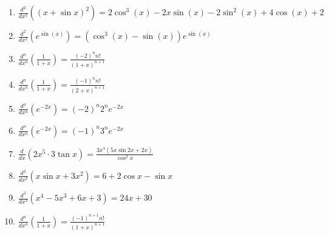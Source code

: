 \documentclass[11pt,a4paper]{article}
\begin{document}
\begin{enumerate}
\item $\displaystyle \frac{d^{2}}{dx^{2}}\left( (x + \sin x)^{2} \right) = 2\cos^{3}(x) - 2x\sin(x) - 2\sin^{2}(x) + 4\cos(x) + 2$
\item $\displaystyle \frac{d^{2}}{dx^{2}}\left( e^{\sin(x)} \right) = \left(\cos^{3}(x) - \sin(x)\right)e^{\sin(x)}$
\item $\displaystyle \frac{d^{n}}{dx^{n}}\left( \frac{1}{1 + x} \right) = \frac{(-2)^{n} n!}{(1 + x)^{n + 1}}$
\item $\displaystyle \frac{d^{n}}{dx^{n}}\left( \frac{1}{1 + x} \right) = \frac{(-1)^{n} n!}{(2 + x)^{n + 1}}$
\item $\displaystyle \frac{d^{n}}{dx^{n}}\left( e^{-2x} \right) = (-2)^{n} 2^{n} e^{-2x}$
\item $\displaystyle \frac{d^{n}}{dx^{n}}\left( e^{-2x} \right) = (-1)^{n} 3^{n} e^{-2x}$
\item $\displaystyle \frac{d}{dx}\left( 2x^{5} \cdot 3\tan x \right) = \frac{3x^{4}(5x\sin 2x + 2x)}{\cos^{2} x}$
\item $\displaystyle \frac{d^{2}}{dx^{2}}\left( x\sin x + 3x^{2} \right) = 6 + 2\cos x - \sin x$
\item $\displaystyle \frac{d^{3}}{dx^{3}}\left( x^{4} - 5x^{3} + 6x + 3 \right) = 24x + 30$
\item $\displaystyle \frac{d^{n}}{dx^{n}}\left( \frac{1}{1 + x} \right) = \frac{(-1)^{n + 1} n!}{(1 + x)^{n + 1}}$
\end{enumerate}
\end{document}

